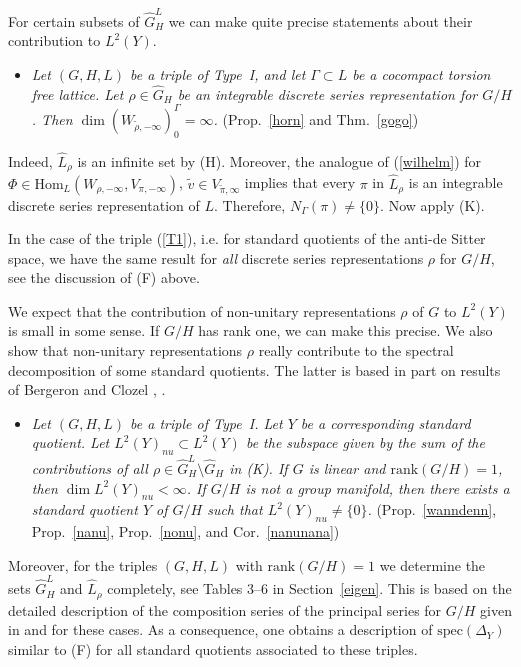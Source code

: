 \documentclass[10]{amsart}
\theoremstyle{remark}
\theoremstyle{definition}
\numberwithin{equation}{section}
\newcommand{\rank}{\text{rank}}
\newcommand{\Hom}{\mathrm{Hom}}
\newcommand{\spec}{{\mathrm{spec}}}
\begin{document}
For certain subsets of $\widehat G_H^L$ we can make quite precise statements about their contribution to $L^2(Y)$.
\begin{itemize}
\item[({\bf L})] {\em Let $(G,H,L)$ be a triple of Type~I, and let $\Gamma\subset L$ be a cocompact torsion free lattice. Let $\rho\in\widehat G_H$ be an integrable discrete series representation for $G/H$. Then $\dim(W_{\widetilde{\rho},-\infty})^\Gamma_0=\infty$.}
(Prop.~\ref{horn} and Thm.~\ref{gogo})
\end{itemize}
Indeed, $\widehat L_\rho$ is an infinite set by (H). Moreover, the analogue of (\ref{wilhelm}) for $\Phi\in \Hom_L(W_{\rho,-\infty},V_{\pi,-\infty})$, $\tilde v\in V_{\tilde\pi,\infty}$ implies that every $\pi$ in $\widehat L_\rho$ is an integrable discrete series representation of $L$.
Therefore, $N_\Gamma(\pi)\ne\{0\}$. Now apply (K).

In the case of the triple (\ref{T1}), i.e. for standard quotients of the anti-de Sitter space, we have the same result for {\em all} discrete series representations $\rho$ for $G/H$,
see the discussion of (F) above.

We expect that the contribution of non-unitary representations $\rho$ of $G$ 
to $L^2(Y)$  is small in some sense. If $G/H$ has rank one, we can make this precise.
We also show that non-unitary representations $\rho$ really contribute to the spectral decomposition of some standard quotients.
The latter is based in part on results of Bergeron and Clozel \cite{BeCl13}, \cite{BeCl17}. 
\begin{itemize}
\item[({\bf M})] {\em Let $(G,H,L)$ be a triple of Type~I. Let $Y$ be a corresponding standard quotient. Let $L^2(Y)_{nu}\subset L^2(Y)$ be the subspace given by the sum of the contributions of all $\rho\in \widehat G_H^L\setminus \widehat G_H$ in (K).  If $G$ is linear and $\rank(G/H)=1$, then  
$\dim L^2(Y)_{nu}<\infty$.
If $G/H$ is not a group manifold, then there exists  a standard quotient $Y$ of $G/H$ such that $L^2(Y)_{nu}\ne\{0\}$.} (Prop.~\ref{wanndenn}, Prop.~\ref{nanu}, Prop.~\ref{nonu}, and Cor.~\ref{nanunana})
\end{itemize}
Moreover, for the triples $(G,H,L)$ with $\rank(G/H)=1$ we determine the sets $\widehat G_H^L$ and $\widehat L_\rho$ completely, see Tables 3--6 in Section~\ref{eigen}.
This is based on the detailed description of the composition series of the principal series for $G/H$ given in \cite{HoTa93} and \cite{Sch87} for these cases. As a consequence, one obtains a description of $\spec(\Delta_Y)$ similar to (F) for all standard quotients associated to these triples.
\end{document}
